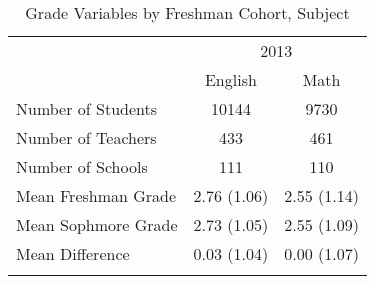 \begin{table}

\caption{\label{tab:table_freq}Grade Variables by Freshman Cohort, Subject\label{tab:table_freq}}
\centering
\begin{tabular}[t]{lcc}
\toprule
\multicolumn{1}{c}{ } & \multicolumn{2}{c}{2013} \\
\cmidrule(l{3pt}r{3pt}){2-3}{}
  & English & Math\\
\midrule
Number of Students & 10144 & 9730\\
Number of Teachers & 433 & 461\\
Number of Schools & 111 & 110\\
\addlinespace
Mean Freshman Grade & 2.76 (1.06) & 2.55 (1.14)\\
Mean Sophmore Grade & 2.73 (1.05) & 2.55 (1.09)\\
Mean Difference & 0.03 (1.04) & 0.00 (1.07)\\
\bottomrule{}
\end{tabular}
\end{table}
